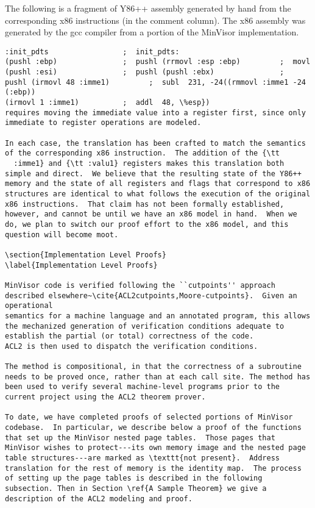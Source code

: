 \documentclass[submission,copyright]{eptcs} \providecommand{\event}{ACL2 2011}
\begin{document}
The following is a fragment of Y86++ assembly generated by hand from
the corresponding x86 instructions (in the comment column).  The x86
assembly was generated by the gcc compiler from a portion of the
MinVisor implementation.
\begin{verbatim}
:init_pdts                 ;  init_pdts:
(pushl :ebp)               ;  pushl (rrmovl :esp :ebp)         ;  movl  (pushl :esi)               ;  pushl (pushl :ebx)               ;  pushl (irmovl 48 :imme1)         ;  subl  231, -24((rmmovl :imme1 -24 (:ebp))
(irmovl 1 :imme1)          ;  addl  48, \%esp})
requires moving the immediate value into a register first, since only
immediate to register operations are modeled.

In each case, the translation has been crafted to match the semantics
of the corresponding x86 instruction.  The addition of the {\tt
  :imme1} and {\tt :valu1} registers makes this translation both
simple and direct.  We believe that the resulting state of the Y86++
memory and the state of all registers and flags that correspond to x86
structures are identical to what follows the execution of the original
x86 instructions.  That claim has not been formally established,
however, and cannot be until we have an x86 model in hand.  When we
do, we plan to switch our proof effort to the x86 model, and this
question will become moot.

\section{Implementation Level Proofs}
\label{Implementation Level Proofs}

MinVisor code is verified following the ``cutpoints'' approach
described elsewhere~\cite{ACL2cutpoints,Moore-cutpoints}.  Given an operational
semantics for a machine language and an annotated program, this allows
the mechanized generation of verification conditions adequate to
establish the partial (or total) correctness of the code.  
ACL2 is then used to dispatch the verification conditions.  

The method is compositional, in that the correctness of a subroutine
needs to be proved once, rather than at each call site. The method has
been used to verify several machine-level programs prior to the
current project using the ACL2 theorem prover.

To date, we have completed proofs of selected portions of MinVisor
codebase.  In particular, we describe below a proof of the functions
that set up the MinVisor nested page tables.  Those pages that
MinVisor wishes to protect---its own memory image and the nested page
table structures---are marked as \texttt{not present}.  Address
translation for the rest of memory is the identity map.  The process
of setting up the page tables is described in the following
subsection. Then in Section \ref{A Sample Theorem} we give a
description of the ACL2 modeling and proof.


\end{verbatim}
\end{document}
